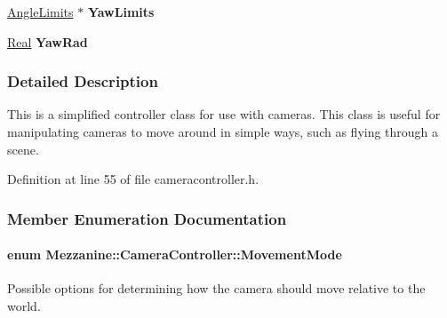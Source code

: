 \begin{DoxyCompactItemize}
\item 
\hypertarget{classMezzanine_1_1CameraController_a370b16b449043a32c3b452396eba8f7c}{
\hyperlink{structMezzanine_1_1CameraController_1_1AngleLimits}{AngleLimits} $\ast$ {\bfseries YawLimits}}
\label{classMezzanine_1_1CameraController_a370b16b449043a32c3b452396eba8f7c}

\item 
\hypertarget{classMezzanine_1_1CameraController_a9227825438aa73bc29eac77cad2e8cfe}{
\hyperlink{namespaceMezzanine_a726731b1a7df72bf3583e4a97282c6f6}{Real} {\bfseries YawRad}}
\label{classMezzanine_1_1CameraController_a9227825438aa73bc29eac77cad2e8cfe}

\end{DoxyCompactItemize}


\subsubsection{Detailed Description}
This is a simplified controller class for use with cameras. This class is useful for manipulating cameras to move around in simple ways, such as flying through a scene. 

Definition at line 55 of file cameracontroller.h.



\subsubsection{Member Enumeration Documentation}
\hypertarget{classMezzanine_1_1CameraController_a2e4a40630fb6c845b8073151dc36c286}{
\paragraph[{MovementMode}]{\setlength{\rightskip}{0pt plus 5cm}enum {\bf Mezzanine::CameraController::MovementMode}}\hfill}
\label{classMezzanine_1_1CameraController_a2e4a40630fb6c845b8073151dc36c286}


Possible options for determining how the camera should move relative to the world. 

